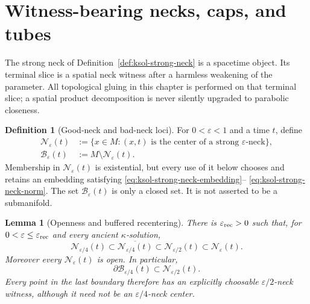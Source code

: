 \documentclass[10pt]{coll-l}
\newtheorem{lemma}[theorem]{Lemma}
\theoremstyle{definition}
\newtheorem{definition}[theorem]{Definition}
\theoremstyle{remark}
\numberwithin{section}{chapter}
\numberwithin{equation}{chapter}
\begin{document}
\section{Witness-bearing necks, caps, and tubes}
\label{sec:ncs-witnesses}

The strong neck of Definition~\ref{def:ksol-strong-neck} is a spacetime
object.  Its terminal slice is a spatial neck witness after a harmless
weakening of the parameter.  All topological gluing in this chapter is
performed on that terminal slice; a spatial product decomposition is never
silently upgraded to parabolic closeness.

\begin{definition}[Good-neck and bad-neck loci]
\label{def:ncs-neck-center-sets}
For $0<\varepsilon<1$ and a time $t$, define
\begin{align}
 \mathscr N_\varepsilon(t)
   &:=\{x\in M:(x,t)\text{ is the center of a strong }
                        \varepsilon\text{-neck}\},             \label{eq:ncs-good-neck-set}\\
 \mathscr B_\varepsilon(t)
   &:=M\setminus\mathscr N_\varepsilon(t).             \label{eq:ncs-bad-neck-set}
\end{align}
Membership in $\mathscr N_\varepsilon(t)$ is existential, but every use of
it below chooses and retains an embedding satisfying
\eqref{eq:ksol-strong-neck-embedding}--
\eqref{eq:ksol-strong-neck-norm}.  The set
$\mathscr B_\varepsilon(t)$ is only a closed set.  It is not asserted to be
a submanifold.
\end{definition}

\begin{lemma}[Openness and buffered recentering]
\label{lem:ncs-neck-openness}
There is $\varepsilon_{\rm rec}>0$ such that, for
$0<\varepsilon\leq\varepsilon_{\rm rec}$ and every ancient
$\kappa$-solution,
\begin{equation}
 \mathscr N_{\varepsilon/4}(t)
       \subset\overline{\mathscr N_{\varepsilon/4}(t)}
       \subset\mathscr N_{\varepsilon/2}(t)
       \subset\mathscr N_\varepsilon(t).              \label{eq:ncs-buffered-neck-closure}
\end{equation}
Moreover every $\mathscr N_\varepsilon(t)$ is open.  In particular,
\begin{equation}
        \partial\mathscr B_{\varepsilon/4}(t)
              \subset\mathscr N_{\varepsilon/2}(t).   \label{eq:ncs-bad-boundary-buffer}
\end{equation}
Every point in the last boundary therefore has an explicitly choosable
$\varepsilon/2$-neck witness, although it need not be an
$\varepsilon/4$-neck center.
\end{lemma}
\end{document}
